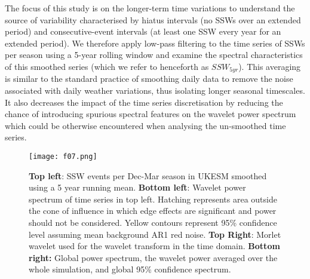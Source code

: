 \documentclass[wcd, manuscript]{copernicus}
\begin{document}

The focus of this study is on the longer-term time variations to understand the source of variability characterised by hiatus intervals (no SSWs over an extended period) and consecutive-event intervals (at least one SSW every year for an extended period). We therefore apply low-pass filtering to the time series of SSWs per season using a 5-year rolling window and examine the spectral characteristics of this smoothed series (which we refer to henceforth as $SSW_{5yr}$). This averaging is similar to the standard practice of smoothing daily data to remove the noise associated with daily weather variations, thus isolating longer seasonal timescales. It also decreases the impact of the time series discretisation by reducing the chance of introducing spurious spectral features on the wavelet power spectrum which could be otherwise encountered when analysing the un-smoothed time series.  

\begin{center}
\begin{figure}[h!]
\noindent\texttt{[image: f07.png]}
\caption{\textbf{Top left}: SSW events per Dec-Mar season in UKESM smoothed using a 5 year running mean. \textbf{Bottom left}: Wavelet power spectrum of time series in top left. Hatching represents area outside the cone of influence in which edge effects are significant and power should not be considered. Yellow contours represent 95\% confidence level assuming mean background AR1 red noise. \textbf{Top Right}: Morlet wavelet used for the wavelet transform in the time domain. \textbf{Bottom right:} Global power spectrum, the wavelet power averaged over the whole simulation, and global 95\% confidence spectrum.}
\label{fig3}
\end{figure}
\end{center}
\end{document}
